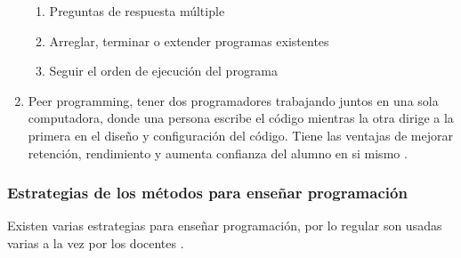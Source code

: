\begin{enumerate}
\begin{enumerate}
            \item Preguntas de respuesta múltiple
            \item Arreglar, terminar o extender programas existentes
            \item Seguir el orden de ejecución del programa
        \end{enumerate}
    \item Peer programming, tener dos programadores trabajando juntos en una sola computadora, donde una persona escribe el código mientras la otra dirige a la primera en el diseño y configuración del código. Tiene las ventajas de mejorar retención, rendimiento y aumenta confianza del alumno en si mismo \cite{ncwit}.
\end{enumerate}

\subsubsection{Estrategias de los métodos para enseñar programación}
Existen varias estrategias para enseñar programación, por lo regular son usadas varias a la vez por los docentes \cite{Szlavi2003}.

